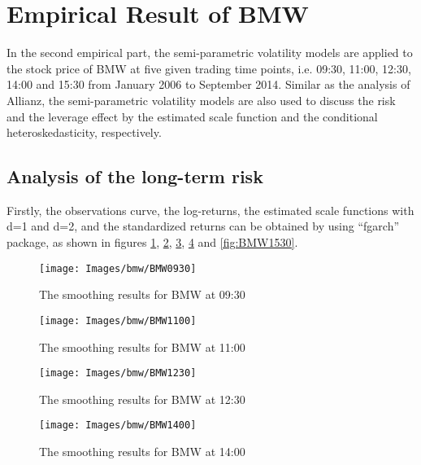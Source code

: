 \section{Empirical Result of BMW}



In the second empirical part, the semi-parametric volatility models are applied to the stock price of BMW at five given trading time points, i.e. 09:30, 11:00, 12:30, 14:00 and 15:30 from January 2006 to September 2014. Similar as the analysis of Allianz, the semi-parametric volatility models are also used to discuss the risk and the leverage effect by the estimated scale function and the conditional heteroskedasticity, respectively.

\subsection{Analysis of the long-term risk}

Firstly, the observations curve, the log-returns, the estimated scale functions with d=1 and d=2, and the standardized returns can be obtained by using ``fgarch'' package, as shown in figures \ref{fig:BMW0930}, \ref{fig:BMW1100}, \ref{fig:BMW1230}, \ref{fig:BMW1400} and \ref{fig:BMW1530}.


\begin{figure}[!htbp]
	\centering
	\texttt{[image: Images/bmw/BMW0930]}
	\caption[The smoothing results for BMW at 09:30]{The smoothing results for BMW at 09:30}
	\label{fig:BMW0930}
\end{figure}

\begin{figure}[!htbp]
	\centering
	\texttt{[image: Images/bmw/BMW1100]}
	\caption[The smoothing results for BMW at 11:00]{The smoothing results for BMW at 11:00}
	\label{fig:BMW1100}
\end{figure}


\begin{figure}[!htbp]
	\centering
	\texttt{[image: Images/bmw/BMW1230]}
	\caption[The smoothing results for BMW at 12:30]{The smoothing results for BMW at 12:30}
	\label{fig:BMW1230}
\end{figure}


\begin{figure}[!htbp]
	\centering
	\texttt{[image: Images/bmw/BMW1400]}
	\caption[The smoothing results for BMW at 14:00]{The smoothing results for BMW at 14:00}
	\label{fig:BMW1400}
\end{figure}


